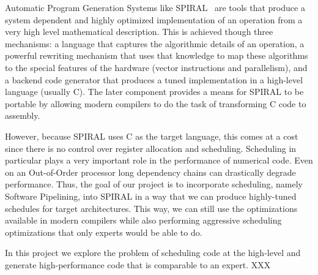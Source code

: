 \documentclass[10pt]{article}
\begin{document}
Automatic Program Generation Systems like SPIRAL~\cite{Pueschel:05} are tools that produce a system
dependent and highly optimized implementation of an operation from a very high level mathematical description. 
This is achieved though three mechanisms: a language that captures the algorithmic details of an operation, a powerful
rewriting mechanism that uses that knowledge to map these algorithms to the special features of the hardware (vector
instructions and parallelism), and a backend code generator that produces a tuned implementation in a high-level language
(usually C). The later component provides a means for SPIRAL to be portable by allowing modern compilers to do the task
of transforming C code to assembly.

However, because SPIRAL uses C as the target language, this comes at a cost since there is no control over register allocation and
scheduling. Scheduling in particular plays a very important role in the performance of numerical code. Even on an Out-of-Order
processor long dependency chains can drastically degrade performance. Thus, the goal of our project is to incorporate scheduling,
namely Software Pipelining, into SPIRAL in a way that we can produce highly-tuned schedules for target architectures.
This way, we can still use the optimizations available in modern compilers while also performing aggressive scheduling optimizations
that only experts would be able to do.

In this project we explore the problem of scheduling code at the high-level and generate high-performance code that is comparable
to an expert. XXX
\end{document}
